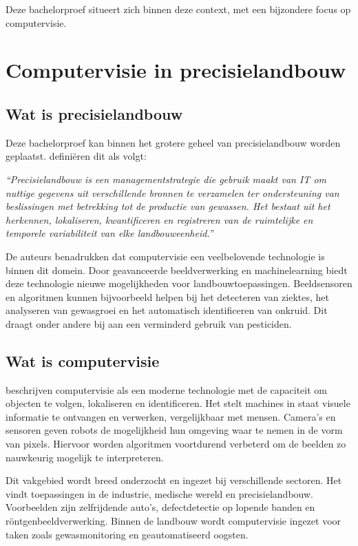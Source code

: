 Deze bachelorproef situeert zich binnen deze context, met een bijzondere focus op computervisie.

\section{Computervisie in precisielandbouw}
\subsection{Wat is precisielandbouw}
Deze bachelorproef kan binnen het grotere geheel van precisielandbouw worden geplaatst. \textcite{Cisternas2020} definiëren dit als volgt: 

\begin{tcolorbox}[colback=gray!5, colframe=white, sharp corners, boxrule=0pt, width=\linewidth]
    \textit{“Precisielandbouw is een managementstrategie die gebruik maakt van IT om nuttige gegevens uit verschillende bronnen te verzamelen ter ondersteuning van beslissingen met betrekking tot de productie van gewassen. Het bestaat uit het herkennen, lokaliseren, kwantificeren en registreren van de ruimtelijke en temporele variabiliteit van elke landbouweenheid.”} 
\end{tcolorbox}

De auteurs benadrukken dat computervisie een veelbelovende technologie is binnen dit domein. Door geavanceerde beeldverwerking en machinelearning biedt deze technologie nieuwe mogelijkheden voor landbouwtoepassingen. Beeldsensoren en algoritmen kunnen bijvoorbeeld helpen bij het detecteren van ziektes, het analyseren van gewasgroei en het automatisch identificeren van onkruid. Dit draagt onder andere bij aan een verminderd gebruik van pesticiden.

\subsection{Wat is computervisie}
\textcite{Radojcic2023} beschrijven computervisie als een moderne technologie met de capaciteit om objecten te volgen, lokaliseren en identificeren. Het stelt machines in staat visuele informatie te ontvangen en verwerken, vergelijkbaar met mensen. Camera’s en sensoren geven robots de mogelijkheid hun omgeving waar te nemen in de vorm van pixels. Hiervoor worden algoritmen voortdurend verbeterd om de beelden zo nauwkeurig mogelijk te interpreteren. 

Dit vakgebied wordt breed onderzocht en ingezet bij verschillende sectoren. Het vindt toepassingen in de industrie, medische wereld en precisielandbouw. Voorbeelden zijn zelfrijdende auto’s, defectdetectie op lopende banden en röntgenbeeldverwerking. Binnen de landbouw wordt computervisie ingezet voor taken zoals gewasmonitoring en geautomatiseerd oogsten.

